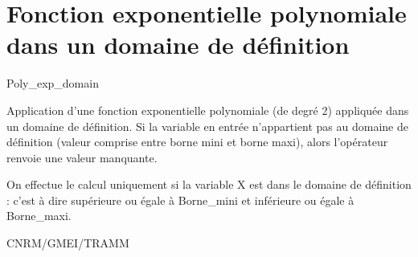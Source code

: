 %
\section{Fonction exponentielle polynomiale dans un domaine de d\'efinition}

 \textsf{Poly\_exp\_domain}

Application d'une fonction exponentielle polynomiale (de degr\'e 2) appliqu\'ee dans un domaine de d\'efinition. Si la variable en entr\'ee n'appartient pas au domaine de d\'efinition (valeur comprise entre borne mini et borne maxi), alors l'op\'erateur renvoie une valeur manquante.

\bigskip





On effectue le calcul uniquement si la variable X est dans le domaine de d\'efinition :
 c'est \`a dire sup\'erieure ou \'egale \`a Borne\_mini et inf\'erieure ou \'egale \`a Borne\_maxi.

CNRM/GMEI/TRAMM

